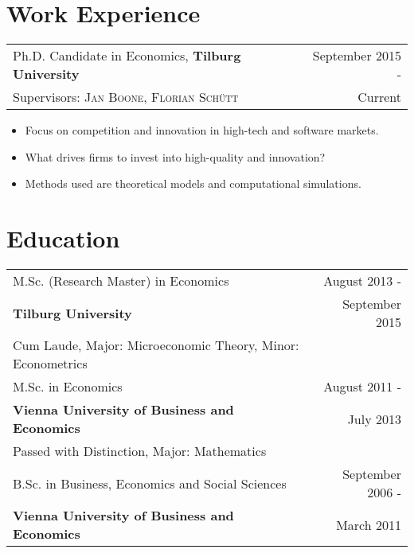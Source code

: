 \documentclass[a4paper,12pt]{article}
\begin{document}
\section{Work Experience}

\begin{tabular}{p{12cm} r}
	Ph.D. Candidate in Economics, \textbf{Tilburg University} &September 2015 -\\
	\small Supervisors:  \textsc{Jan Boone},  \textsc{Florian Schütt} & Current\phantom{ -}\\
\end{tabular}
\begin{itemize}[noitemsep]
	\item Focus on competition and innovation in high-tech and software markets.
	\item What drives firms to invest into high-quality and innovation?
	\item Methods used are theoretical models and computational simulations.
\end{itemize}

\section{Education}

\begin{tabular}{p{12cm} r}
	M.Sc. (Research Master) in Economics&  August 2013 - \\
	\textbf{Tilburg University}& September 2015\phantom{ -}\\
	Cum Laude, Major: Microeconomic Theory, Minor: Econometrics\vspace{0.5em}\\

	M.Sc. in Economics & August 2011 -  \\
	\textbf{Vienna University of Business and Economics}& July 2013\phantom{ -}\\
	Passed with Distinction, Major: Mathematics&\vspace{0.5em}\\ 
	
	B.Sc. in Business, Economics and Social Sciences& September 2006 - \\ 
	\normalsize\textbf{Vienna University of Business and Economics}& March 2011\phantom{ -}\\
\end{tabular}\\
\end{document}
